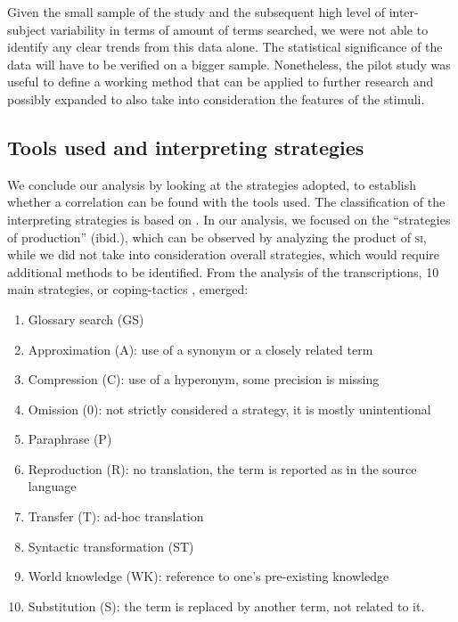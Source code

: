 \documentclass[output=paper]{langsci/langscibook}
\begin{document}
Given the small sample of the study and the subsequent high level of inter-subject variability in terms of amount of terms searched, we were not able to identify any clear trends from this data alone. The statistical significance of the data will have to be verified on a bigger sample. Nonetheless, the pilot study was useful to define a working method that can be applied to further research and possibly expanded to also take into consideration the features of the stimuli. 

\subsection{Tools used and interpreting strategies}\label{sec:prandi:5.3}
We conclude our analysis by looking at the strategies adopted, to establish whether a correlation can be found with the tools used. The classification of the interpreting strategies is based on \citet{Bartlomiejczyk2006}. In our analysis, we focused on the ``strategies of production'' (ibid.), which can be observed by analyzing the product of \textsc{si}, while we did not take into consideration overall strategies, which would require additional methods to be identified. From the analysis of the transcriptions, 10 main strategies, or coping-tactics \citep{Gile1995}, emerged:

\begin{enumerate}
\item Glossary search (\textsc{GS})
\item Approximation (\textsc{A}): use of a synonym or a closely related term
\item Compression (\textsc{C}): use of a hyperonym, some precision is missing
\item Omission (\textsc{0}): not strictly considered a strategy, it is mostly unintentional
\item Paraphrase (\textsc{P})
\item Reproduction (\textsc{R}): no translation, the term is reported as in the source language
\item Transfer (\textsc{T}): ad-hoc translation
\item Syntactic transformation (\textsc{ST})
\item World knowledge (\textsc{WK}): reference to one’s pre-existing knowledge
\item Substitution (\textsc{S}): the term is replaced by another term, not related to it.
\end{enumerate}
\end{document}
